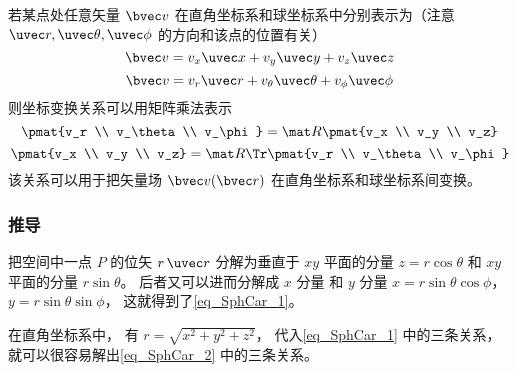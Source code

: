若某点处任意矢量 $\bvec v$ 在直角坐标系和球坐标系中分别表示为（注意 $\uvec r, \uvec \theta, \uvec \phi$ 的方向和该点的位置有关）
\begin{equation}\label{eq_SphCar_7}
\bvec v = v_x \uvec x + v_y \uvec y + v_z \uvec z
\end{equation}
\begin{equation}\label{eq_SphCar_6}
\bvec v = v_r \uvec r + v_\theta \uvec \theta + v_\phi \uvec \phi
\end{equation}
则坐标变换关系可以用矩阵乘法表示
\begin{equation}\label{eq_SphCar_9}
\pmat{v_r \\ v_\theta \\ v_\phi}
= \mat R \pmat{v_x \\ v_y \\ v_z}
\end{equation}
\begin{equation}\label{eq_SphCar_8}
\pmat{v_x \\ v_y \\ v_z}
= \mat R\Tr \pmat{v_r \\ v_\theta \\ v_\phi}
\end{equation}
该关系可以用于把矢量场 $\bvec v(\bvec r)$ 在直角坐标系和球坐标系间变换。

\subsubsection{推导}
把空间中一点 $P$ 的位矢 $r \,\uvec r$ 分解为垂直于 $xy$ 平面的分量 $z = r\cos \theta $ 和 $xy$ 平面的分量 $r\sin \theta $。 后者又可以进而分解成 $x$ 分量 和 $y$ 分量  $x = r\sin \theta \cos \phi$，  $y = r\sin \theta \sin \phi$， 这就得到了\autoref{eq_SphCar_1}。

在直角坐标系中， 有 $r = \sqrt {x^2 + y^2 + z^2}$， 代入\autoref{eq_SphCar_1} 中的三条关系，就可以很容易解出\autoref{eq_SphCar_2} 中的三条关系。

